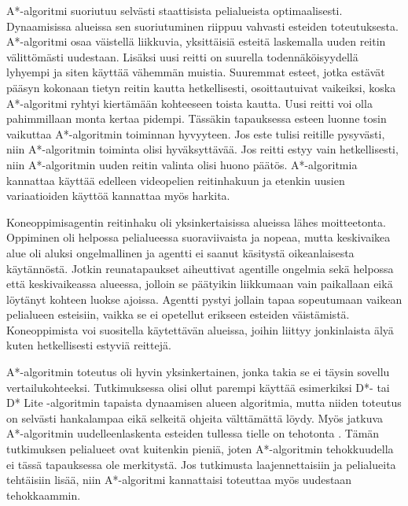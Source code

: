 \documentclass[utf8]{gradu3}
\begin{document}
A*-algoritmi suoriutuu selvästi staattisista pelialueista optimaalisesti. Dynaamisissa alueissa sen suoriutuminen riippuu vahvasti esteiden toteutuksesta. A*-algoritmi osaa väistellä liikkuvia, yksittäisiä esteitä laskemalla uuden reitin välittömästi uudestaan. Lisäksi uusi reitti on suurella todennäköisyydellä lyhyempi ja siten käyttää vähemmän muistia. Suuremmat esteet, jotka estävät pääsyn kokonaan tietyn reitin kautta hetkellisesti, osoittautuivat vaikeiksi, koska A*-algoritmi ryhtyi kiertämään kohteeseen toista kautta. Uusi reitti voi olla pahimmillaan monta kertaa pidempi. Tässäkin tapauksessa esteen luonne tosin vaikuttaa A*-algoritmin toiminnan hyvyyteen. Jos este tulisi reitille pysyvästi, niin A*-algoritmin toiminta olisi hyväksyttävää. Jos reitti estyy vain hetkellisesti, niin A*-algoritmin uuden reitin valinta olisi huono päätös. A*-algoritmia kannattaa käyttää edelleen videopelien reitinhakuun ja etenkin uusien variaatioiden käyttöä kannattaa myös harkita.

Koneoppimisagentin reitinhaku oli yksinkertaisissa alueissa lähes moitteetonta. Oppiminen oli helpossa pelialueessa suoraviivaista ja nopeaa, mutta keskivaikea alue oli aluksi ongelmallinen ja agentti ei saanut käsitystä oikeanlaisesta käytännöstä. Jotkin reunatapaukset aiheuttivat agentille ongelmia sekä helpossa että keskivaikeassa alueessa, jolloin se päätyikin liikkumaan vain paikallaan eikä löytänyt kohteen luokse ajoissa. Agentti pystyi jollain tapaa sopeutumaan vaikean pelialueen esteisiin, vaikka se ei opetellut erikseen esteiden väistämistä. Koneoppimista voi suositella käytettävän alueissa, joihin liittyy jonkinlaista älyä kuten hetkellisesti estyviä reittejä.

A*-algoritmin toteutus oli hyvin yksinkertainen, jonka takia se ei täysin sovellu vertailukohteeksi. Tutkimuksessa olisi ollut parempi käyttää esimerkiksi D*- tai D* Lite -algoritmin tapaista dynaamisen alueen algoritmia, mutta niiden toteutus on selvästi hankalampaa eikä selkeitä ohjeita välttämättä löydy. Myös jatkuva A*-algoritmin uudelleenlaskenta esteiden tullessa tielle on tehotonta \parencite{stentz1995focussed}. Tämän tutkimuksen pelialueet ovat kuitenkin pieniä, joten A*-algoritmin tehokkuudella ei tässä tapauksessa ole merkitystä. Jos tutkimusta laajennettaisiin ja pelialueita tehtäisiin lisää, niin A*-algoritmi kannattaisi toteuttaa myös uudestaan tehokkaammin.
\end{document}
